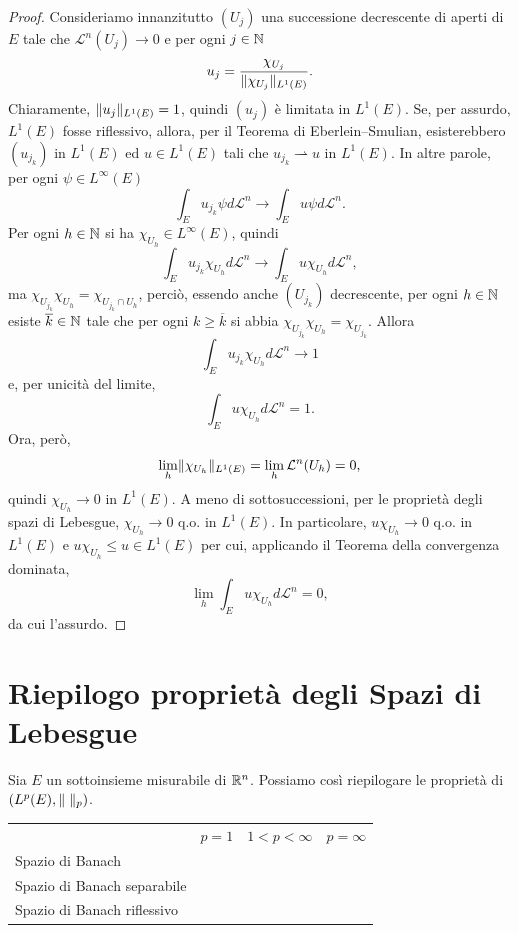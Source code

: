 \begin{proof}
	Consideriamo innanzitutto $(U_j)$ una successione decrescente di aperti di $E$ tale che $\mathcal{L}^n(U_j) \to 0$ e per ogni $j \in \mathbb{N}$
	\[ u_j = \frac{\chi_{U_j}}{\lVert\chi_{U_j}\rVert_{L^1(E)}}. \]
	Chiaramente, $\lVert u_j\rVert_{L^1(E)} = 1$, quindi $(u_j)$ è limitata in $L^1(E)$. Se, per assurdo, $L^1(E)$ fosse riflessivo, allora, per il Teorema di Eberlein--Smulian, esisterebbero $(u_{j_k})$ in $L^1(E)$ ed $u \in L^1(E)$ tali che $u_{j_k} \rightharpoonup u$ in $L^1(E)$. In altre parole, per ogni $\psi \in L^\infty(E)$
	\[ \int_E u_{j_k}\psi d\mathcal{L}^n \to \int_E u \psi d\mathcal{L}^n. \]
	Per ogni $h \in \mathbb{N}$ si ha $\chi_{U_h} \in L^\infty(E)$, quindi 
	\[ \int_E u_{j_k}\chi_{U_h} d\mathcal{L}^n \to \int_E u \chi_{U_h} d\mathcal{L}^n, \]
	ma $\chi_{U_{j_k}}\chi_{U_h} = \chi_{U_{j_k}\cap U_h}$, perciò, essendo anche $(U_{j_k})$ decrescente, per ogni $h \in \mathbb{N}$ esiste $\overline{k} \in \mathbb{N}$ tale che per ogni $k \ge \overline{k}$ si abbia $\chi_{U_{j_k}}\chi_{U_h} = \chi_{U_{j_k}}$. Allora
	\[  \int_E u_{j_k}\chi_{U_h} d\mathcal{L}^n \to 1 \]
	e, per unicità del limite,
	\[ \int_E u \chi_{U_h} d\mathcal{L}^n = 1. \]
	Ora, però, 
	\[ \lim\limits_{h} \lVert\chi_{U_h}\rVert_{L^1(E)} = \lim\limits_{h} \mathcal{L}^n(U_h) = 0,\]
	quindi $\chi_{U_h} \to 0$ in $L^1(E)$. A meno di sottosuccessioni, per le proprietà degli spazi di Lebesgue, $\chi_{U_h} \to 0$ q.o. in $L^1(E)$. In particolare, $u\chi_{U_h} \to 0$ q.o. in $L^1(E)$ e $u\chi_{U_h} \le u \in L^1(E)$ per cui, applicando il Teorema della convergenza dominata,
	\[  \lim\limits_{h} \int_E u\chi_{U_h} d\mathcal{L}^n = 0, \]
	da cui l'assurdo.
\end{proof}

\section*{Riepilogo proprietà degli Spazi di Lebesgue}
Sia $E$ un sottoinsieme misurabile di $\mathbb{R}^{n}$. Possiamo così riepilogare le proprietà di $(L^{p}(E), \lVert\;\rVert_{p})$.

\hfill

\begin{center}
	\begin{tabular}{lccc}
		
		& $p=1$ & $1<p<\infty$ & $p=\infty$ \\
		
		Spazio di Banach & \checked & \checked & \checked \\
		
		Spazio di Banach separabile & \checked & \checked &  \\
		
		Spazio di Banach riflessivo &  & \checked &  \\
		
	\end{tabular}
\end{center}

